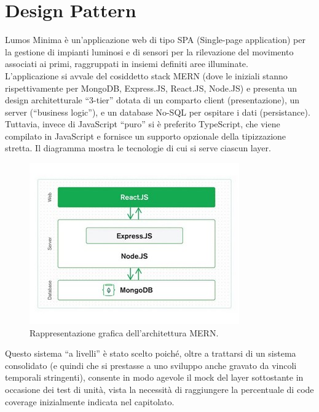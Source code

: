 \documentclass[a4paper, 11pt]{article}
\begin{document}
\newpage
\section{Design Pattern}
Lumos Minima è un'applicazione web di tipo SPA (Single-page application) per la gestione di impianti luminosi e di sensori per la rilevazione del movimento associati ai primi, raggruppati in insiemi definiti aree illuminate.\\
L'applicazione si avvale del cosiddetto stack MERN (dove le iniziali stanno rispettivamente per MongoDB, Express.JS, React.JS, Node.JS) e presenta un design architetturale “3-tier” dotata di un comparto client (presentazione), un server (“business logic”), e un database No-SQL per ospitare i dati (persistance). Tuttavia, invece di JavaScript “puro” si è preferito TypeScript, che viene compilato in JavaScript e fornisce un supporto opzionale della tipizzazione stretta. Il diagramma mostra le tecnologie di cui si serve ciascun layer.
\begin{figure}[H]
    \centering
    \includegraphics[width=\textwidth]{MERN}
    \caption{Rappresentazione grafica dell'architettura MERN.}
\end{figure}
Questo sistema “a livelli” è stato scelto poiché, oltre a trattarsi di un sistema consolidato (e quindi che si prestasse a uno sviluppo anche gravato da vincoli temporali stringenti), consente in modo agevole il mock del layer sottostante in occasione dei test di unità, vista la necessità di raggiungere la percentuale di code coverage inizialmente indicata nel capitolato.
\end{document}
